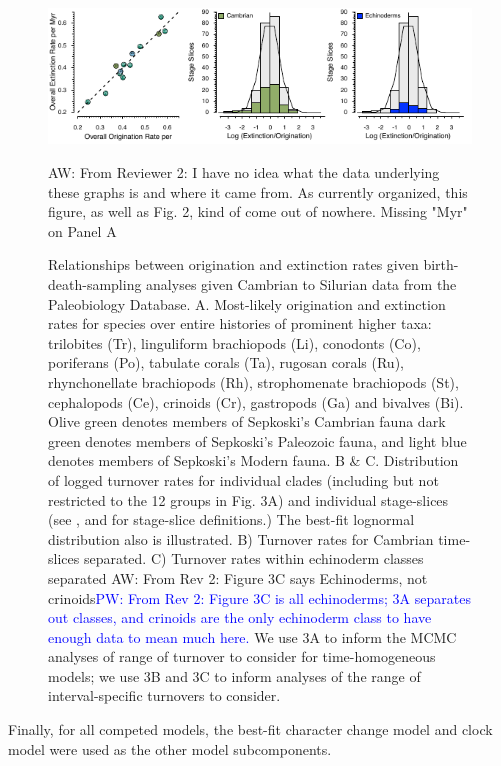 \documentclass{article}
\newcommand{\amw}[1]{{\textcolor{OliveGreen}{AW: #1}}} %
\newcommand{\pjw}[1]{{\textcolor{blue}{PW: #1}}} %
\begin{document}
\begin{figure}
  \includegraphics[width=\textwidth]{figures/Turnover PaleoStyle.pdf}

  \caption{Relationships between origination and extinction rates given birth-death-sampling analyses given Cambrian to Silurian data from the Paleobiology Database.  A. Most-likely origination and extinction rates for species over entire histories of prominent higher taxa: trilobites (Tr), linguliform brachiopods (Li), conodonts (Co), poriferans (Po), tabulate corals (Ta), rugosan corals (Ru), rhynchonellate brachiopods (Rh), strophomenate brachiopods (St), cephalopods (Ce), crinoids (Cr), gastropods (Ga) and bivalves (Bi). Olive green denotes members of Sepkoski's Cambrian fauna \citep{Sepkoski1981} dark green denotes members of Sepkoski's Paleozoic fauna, and light blue denotes members of Sepkoski's Modern fauna. B \& C. Distribution of logged turnover rates for individual clades (including but not restricted to the 12 groups in Fig. 3A) and individual stage-slices (see \cite{Bergstrom2009}, \cite{Cramer2011} and \cite{Rasmussen2019} for stage-slice definitions.)  The best-fit lognormal distribution also is illustrated.  B) Turnover rates for Cambrian time-slices separated.  C) Turnover rates within echinoderm classes separated \amw{From Rev 2: Figure 3C says Echinoderms, not crinoids}\pjw{From Rev 2: Figure 3C is all echinoderms; 3A separates out classes, and crinoids are the only echinoderm class to have enough data to mean much here.}  We use 3A to inform the MCMC analyses of range of turnover to consider for time-homogeneous models; we use 3B and 3C to inform analyses of the range of interval-specific turnovers to consider.} %
  \amw{From Reviewer 2: I have no idea what the data underlying these graphs is and where it came from. As currently organized, this figure, as well as Fig. 2, kind of come out of nowhere. Missing "Myr" on Panel A} 
\end{figure}

Finally, for all competed models, the best-fit character change model and clock model were used as the other model subcomponents.
\end{document}
